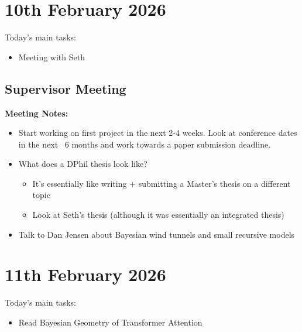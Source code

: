 \documentclass[12pt,a4paper,twoside]{article}
\begin{document}
\section{10th February 2026}

\begin{summary}
	Today's main tasks:
	\begin{itemize}[leftmargin=*]
		\item Meeting with Seth
	\end{itemize}
\end{summary}

\subsection{Supervisor Meeting}
\begin{meetingsummary}
	\textbf{Meeting Notes:}
	\begin{itemize}
		\item Start working on first project in the next 2-4 weeks. Look at conference dates in the next ~6 months and work towards a paper submission deadline.
		\item What does a DPhil thesis look like?
		      \begin{itemize}
			      \item[$\rightarrow$] It's essentially like writing + submitting a Master's thesis on a different topic
			      \item[$\rightarrow$] Look at Seth's thesis (although it was essentially an integrated thesis)
		      \end{itemize}
		\item Talk to Dan Jensen about Bayesian wind tunnels and small recursive models
	\end{itemize}
\end{meetingsummary}

\section{11th February 2026}

\begin{summary}
	Today's main tasks:
	\begin{itemize}[leftmargin=*]
		\item Read Bayesian Geometry of Transformer Attention~\cite{Agarwal2026}
	\end{itemize}
\end{summary}
\end{document}
